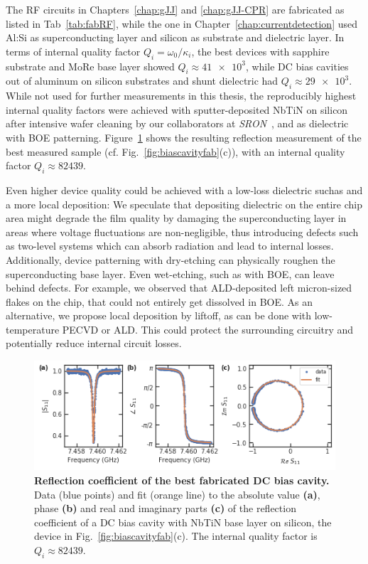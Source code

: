 The RF circuits in Chapters~\ref{chap:gJJ} and \ref{chap:gJJ-CPR} are fabricated as listed in Tab~\ref{tab:fabRF}, while the one in Chapter~\ref{chap:currentdetection} used Al:Si as superconducting layer and silicon as substrate and dielectric layer.
%
In terms of internal quality factor $Q_i=\omega_0/\kappa_i$, the best devices with sapphire substrate and MoRe base layer showed $Q_i\approx\num{41e3}$, while DC bias cavities out of aluminum on silicon substrates and shunt dielectric had $Q_i\approx\num{29e3}$.
%
While not used for further measurements in this thesis, the reproducibly highest internal quality factors were achieved with sputter-deposited NbTiN on silicon after intensive wafer cleaning by our collaborators at \textit{SRON}~\cite{thoenSuperconductingNbTinThin2017}, and  as dielectric with BOE patterning.
%
Figure~\ref{fig:s11NbTiN} shows the resulting reflection measurement of the best measured sample (cf. Fig.~\ref{fig:biascavityfab}(c)), with an internal quality factor $Q_i\approx\num{82439}$.

Even higher device quality could be achieved with a low-loss dielectric suchas  and a more local deposition:
%
We speculate that depositing dielectric on the entire chip area might degrade the film quality by damaging the superconducting layer in areas where voltage fluctuations are non-negligible, thus introducing defects such as two-level systems which can absorb radiation and lead to internal losses.
%
Additionally, device patterning with dry-etching can physically roughen the superconducting base layer.
%
Even wet-etching, such as with BOE, can leave behind defects.
%
For example, we observed that ALD-deposited  left micron-sized flakes on the chip, that could not entirely get dissolved in BOE.
%
As an alternative, we propose local deposition by liftoff, as can be done with low-temperature PECVD or ALD.
%
This could protect the surrounding circuitry and potentially reduce internal circuit losses.

\begin{figure}
	\centering
	\includegraphics[width=\linewidth]{chapter-experimental-methods/figs-fabrication/s11_NbTiN}
	\caption{
		\textbf{Reflection coefficient of the best fabricated DC bias cavity.}
		Data (blue points) and fit (orange line) to the absolute value \textbf{(a)}, phase \textbf{(b)} and real and imaginary parts \textbf{(c)} of the reflection coefficient of a DC bias cavity with NbTiN base layer on silicon, the device in Fig.~\ref{fig:biascavityfab}(c).
		The internal quality factor is $Q_i\approx\num{82439}$.
	}
	\label{fig:s11NbTiN}
\end{figure}
